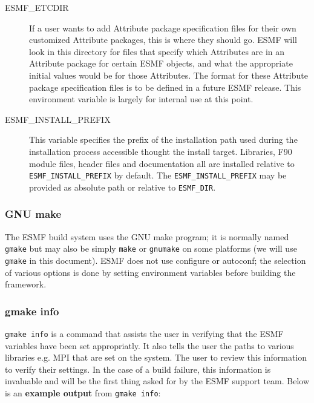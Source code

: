 \begin{description}
\item[ESMF\_ETCDIR]
If a user wants to add Attribute package specification files for their own customized Attribute packages, this is where they should go.  ESMF will look in this directory for files that specify which Attributes are in an Attribute package for certain ESMF objects, and what the appropriate initial values would be for those Attributes.  The format for these Attribute package specification files is to be defined in a future ESMF release.  This environment variable is largely for internal use at this point. 

\item[ESMF\_INSTALL\_PREFIX]
This variable specifies the prefix of the installation path used during the
installation process accessible thought the install target. Libraries, F90
module files, header files and documentation all are installed relative to
{\tt ESMF\_INSTALL\_PREFIX} by default. The {\tt ESMF\_INSTALL\_PREFIX} may be
provided as absolute path or relative to {\tt ESMF\_DIR}.

\end{description}


\subsubsection{GNU make}
The ESMF build system uses the GNU make program; it is normally named 
{\tt gmake} but may also be simply {\tt make} or {\tt gnumake} on some 
platforms (we will use {\tt gmake} in this document). ESMF does not use
configure or autoconf;  the selection of various options is done by
setting environment variables before building the framework. 


\subsubsection{gmake info}
{\tt gmake info} is a command that assists the user in verifying that the ESMF 
variables have been set appropriatly. It also tells the user the paths to 
various libraries e.g. MPI that are set on the system. The user to review 
this information to verify their settings. In the case of a build failure, 
this information is invaluable and will be the first thing asked for by the
ESMF support team. Below is an {\bf example output} from {\tt gmake info}: 
 

